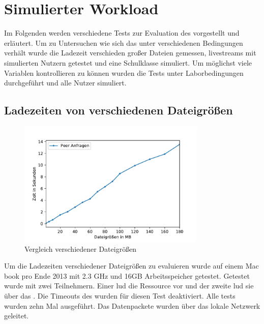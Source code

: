 %



\section{Simulierter Workload}

Im Folgenden werden verschiedene Tests zur Evaluation des \pTp \cdns vorgestellt und erläutert. Um zu Untersuchen wie sich das \cdn unter verschiedenen Bedingungen verhält wurde die Ladezeit verschieden großer Dateien gemessen, livestreams mit simulierten Nutzern getestet und eine Schulklasse simuliert. Um möglichst viele Variablen kontrollieren zu können wurden die Tests unter Laborbedingungen durchgeführt und alle Nutzer simuliert.

\subsection{Ladezeiten von verschiedenen Dateigrößen}
\begin{figure}[!h]
	\centering
	\includegraphics[width=0.8\textwidth]{figures/Timing_file_size}
	\caption[A Figure Short-Title]{Vergleich verschiedener Dateigrößen}
	\label{fig:timing_file_size}
\end{figure}

Um die Ladezeiten verschiedener Dateigrößen zu evaluieren wurde auf einem Mac book pro Ende 2013 mit 2.3 GHz und 16GB Arbeitsspeicher getestet. 
Getestet wurde mit zwei Teilnehmern. Einer lud die Ressource vor und der zweite lud sie über das \pTp \cdn. Die Timeouts des \pTp \cdns wurden für diesen Test deaktiviert. Alle tests wurden zehn Mal ausgeführt. Das \pTp Datenpackete wurden über das lokale Netzwerk geleitet.

